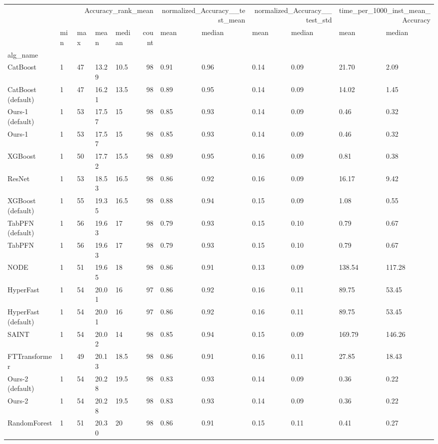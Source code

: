 \begin{tabular}{lllllrllllll}
\toprule
 & \multicolumn{5}{r}{Accuracy_rank_mean} & \multicolumn{2}{r}{normalized_Accuracy__test_mean} & \multicolumn{2}{r}{normalized_Accuracy__test_std} & \multicolumn{2}{r}{time_per_1000_inst_mean_Accuracy} \\
 & min & max & mean & median & count & mean & median & mean & median & mean & median \\
alg_name &  &  &  &  &  &  &  &  &  &  &  \\
\midrule
CatBoost & 1 & 47 & 13.29 & 10.5 & 98 & 0.91 & 0.96 & 0.14 & 0.09 & 21.70 & 2.09 \\
CatBoost (default) & 1 & 47 & 16.21 & 13.5 & 98 & 0.89 & 0.95 & 0.14 & 0.09 & 14.02 & 1.45 \\
Ours-1 (default) & 1 & 53 & 17.57 & 15 & 98 & 0.85 & 0.93 & 0.14 & 0.09 & 0.46 & 0.32 \\
Ours-1 & 1 & 53 & 17.57 & 15 & 98 & 0.85 & 0.93 & 0.14 & 0.09 & 0.46 & 0.32 \\
XGBoost & 1 & 50 & 17.72 & 15.5 & 98 & 0.89 & 0.95 & 0.16 & 0.09 & 0.81 & 0.38 \\
ResNet & 1 & 53 & 18.53 & 16.5 & 98 & 0.86 & 0.92 & 0.16 & 0.09 & 16.17 & 9.42 \\
XGBoost (default) & 1 & 55 & 19.35 & 16.5 & 98 & 0.88 & 0.94 & 0.15 & 0.09 & 1.08 & 0.55 \\
TabPFN (default) & 1 & 56 & 19.63 & 17 & 98 & 0.79 & 0.93 & 0.15 & 0.10 & 0.79 & 0.67 \\
TabPFN & 1 & 56 & 19.63 & 17 & 98 & 0.79 & 0.93 & 0.15 & 0.10 & 0.79 & 0.67 \\
NODE & 1 & 51 & 19.65 & 18 & 98 & 0.86 & 0.91 & 0.13 & 0.09 & 138.54 & 117.28 \\
HyperFast & 1 & 54 & 20.01 & 16 & 97 & 0.86 & 0.92 & 0.16 & 0.11 & 89.75 & 53.45 \\
HyperFast (default) & 1 & 54 & 20.01 & 16 & 97 & 0.86 & 0.92 & 0.16 & 0.11 & 89.75 & 53.45 \\
SAINT & 1 & 54 & 20.02 & 14 & 98 & 0.85 & 0.94 & 0.15 & 0.09 & 169.79 & 146.26 \\
FTTransformer & 1 & 49 & 20.13 & 18.5 & 98 & 0.86 & 0.91 & 0.16 & 0.11 & 27.85 & 18.43 \\
Ours-2 (default) & 1 & 54 & 20.28 & 19.5 & 98 & 0.83 & 0.93 & 0.14 & 0.09 & 0.36 & 0.22 \\
Ours-2 & 1 & 54 & 20.28 & 19.5 & 98 & 0.83 & 0.93 & 0.14 & 0.09 & 0.36 & 0.22 \\
RandomForest & 1 & 51 & 20.30 & 20 & 98 & 0.86 & 0.91 & 0.15 & 0.11 & 0.41 & 0.27 \\

\end{tabular}
